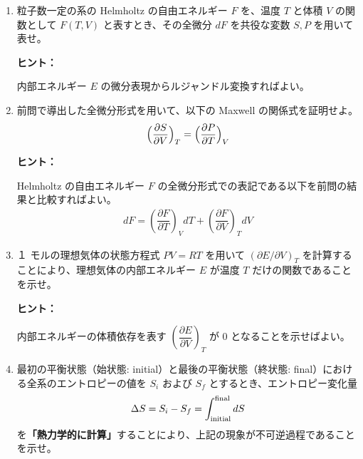 \documentclass[uplatex,dvipdfmx,a4paper,11pt]{jsarticle}
\begin{document}
\begin{enumerate}
\setlength{\parskip}{0cm} %
\setlength{\itemsep}{0.3cm} %

\item
粒子数一定の系の Helmholtz の自由エネルギー $F$ を、温度 $T$ と体積 $V$ の関数として $F(T,V)$ と表すとき、その全微分 $dF$ を共役な変数 $S,P$ を用いて表せ。


\begin{itembox}[l]{{\bf ヒント：}}

内部エネルギー $E$ の微分表現からルジャンドル変換すればよい。

\end{itembox}

\color{black}

\item
前問で導出した全微分形式を用いて、以下の Maxwell の関係式を証明せよ。
\begin{equation*}
\Bigl( \frac{\partial S}{\partial V} \Bigr)_T = \Bigl( \frac{\partial P}{\partial T} \Bigr)_V
\end{equation*}


\begin{itembox}[l]{{\bf ヒント：}}

Helmholtz の自由エネルギー $F$ の全微分形式での表記である以下を前問の結果と比較すればよい。
\begin{align*}
dF = \left( \dfrac{\partial F}{\partial T} \right)_V dT + \left( \dfrac{\partial  F}{\partial V} \right)_T dV
\end{align*}

\end{itembox}

\color{black}

\item
１ モルの理想気体の状態方程式 $PV = RT$ を用いて $(\partial E / \partial V)_T$ を計算することにより、理想気体の内部エネルギー $E$ が温度 $T$ だけの関数であることを示せ。


\begin{itembox}[l]{{\bf ヒント：}}

内部エネルギーの体積依存を表す $\left(\dfrac{\partial E}{\partial V} \right)_T$ が 0 となることを示せばよい。

\end{itembox}

\color{black}

\item
\label{part: ref1}
最初の平衡状態（始状態: initial）と最後の平衡状態（終状態: final）における全系のエントロピーの値を $S_{i}$ および $S_{f}$ とするとき、エントロピー変化量
\begin{equation*}
\Delta S = S_{i} - S_{f} = \int_{\rm initial}^{\rm final} dS
\end{equation*}
を{\bf 「熱力学的に計算」}することにより、上記の現象が不可逆過程であることを示せ。


\end{enumerate}
\end{document}
